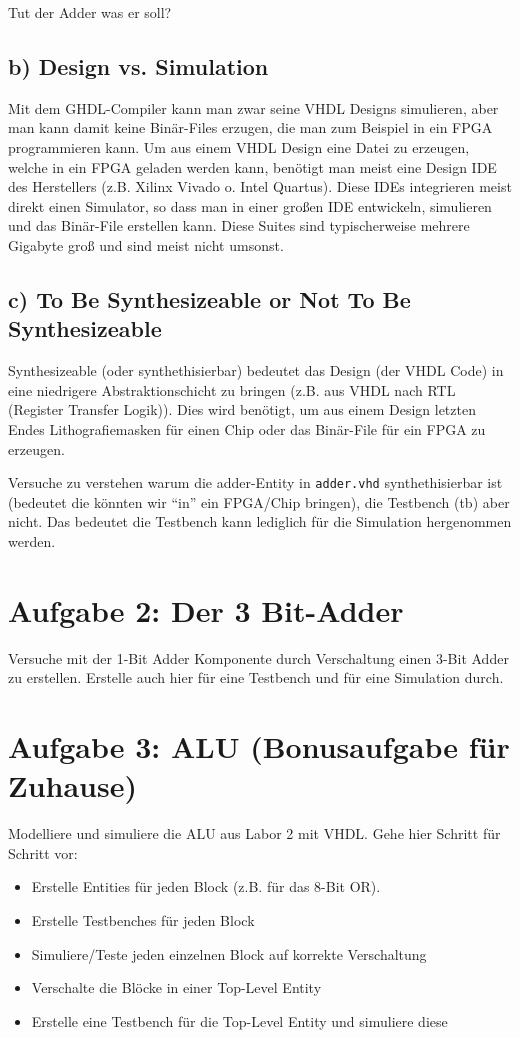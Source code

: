 \documentclass[a4paper]{scrartcl}
\begin{document}
Tut der Adder was er soll?

\subsection*{b) Design vs. Simulation}
Mit dem GHDL-Compiler kann man zwar seine VHDL Designs simulieren, aber man kann damit keine Binär-Files erzugen, die man zum Beispiel in ein FPGA programmieren kann. 
Um aus einem VHDL Design eine Datei zu erzeugen, welche in ein FPGA geladen werden kann, benötigt man meist eine Design IDE des Herstellers (z.B. Xilinx Vivado o.
Intel Quartus). Diese IDEs integrieren meist direkt einen Simulator, so dass man in einer großen IDE entwickeln, simulieren und das Binär-File erstellen kann. Diese
Suites sind typischerweise mehrere Gigabyte groß und sind meist nicht umsonst.

\subsection*{c) To Be Synthesizeable or Not To Be Synthesizeable}
Synthesizeable (oder synthethisierbar) bedeutet das Design (der VHDL Code) in eine niedrigere Abstraktionschicht zu bringen (z.B. aus VHDL nach RTL (Register Transfer Logik)). Dies wird
benötigt, um aus einem Design letzten Endes Lithografiemasken für einen Chip oder das Binär-File für ein FPGA zu erzeugen. 

Versuche zu verstehen warum die adder-Entity in \texttt{adder.vhd} synthethisierbar ist (bedeutet die könnten wir ``in'' ein FPGA/Chip bringen), die Testbench (tb) aber nicht.
Das bedeutet die Testbench kann lediglich für die Simulation hergenommen werden.

\section*{Aufgabe 2: Der 3 Bit-Adder}
Versuche mit der 1-Bit Adder Komponente durch Verschaltung einen 3-Bit Adder zu erstellen. Erstelle auch hier für eine Testbench und für eine Simulation durch.

\section*{Aufgabe 3: ALU (Bonusaufgabe für Zuhause)}
Modelliere und simuliere die ALU aus Labor 2 mit VHDL. Gehe hier Schritt für Schritt vor:\\
\begin{itemize}
  \item Erstelle Entities für jeden Block (z.B. für das 8-Bit OR).
  \item Erstelle Testbenches für jeden Block
  \item Simuliere/Teste jeden einzelnen Block auf korrekte Verschaltung
  \item Verschalte die Blöcke in einer Top-Level Entity
  \item Erstelle eine Testbench für die Top-Level Entity und simuliere diese
\end{itemize}
\end{document}
